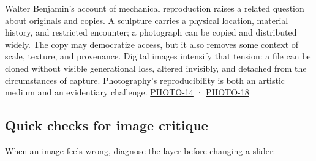 Walter Benjamin's account of mechanical reproduction raises a related question about originals and copies. A sculpture carries a physical location, material history, and restricted encounter; a photograph can be copied and distributed widely. The copy may democratize access, but it also removes some context of scale, texture, and provenance. Digital images intensify that tension: a file can be cloned without visible generational loss, altered invisibly, and detached from the circumstances of capture. Photography's reproducibility is both an artistic medium and an evidentiary challenge. \hyperref[04-visual-computing-ii-ch036-photo-14---photography-session-14]{PHOTO-14} · \hyperref[04-visual-computing-ii-ch036-photo-18---photography-session-18]{PHOTO-18}

\subsection{Quick checks for image critique}\label{04-visual-computing-ii-ch034-quick-checks-for-image-critique}

\hypertarget{04-visual-computing-ii-ch034-quick-checks-for-image-critique}{}

When an image feels wrong, diagnose the layer before changing a slider:

